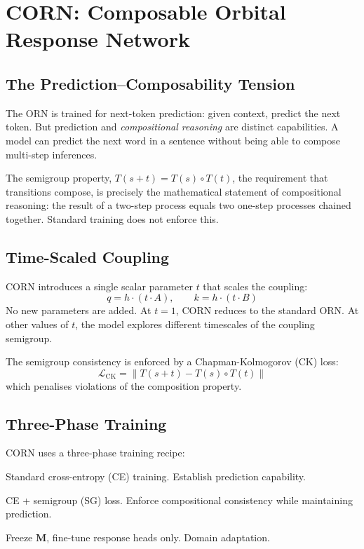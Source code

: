 \documentclass[11pt, a4paper]{article}
\newcommand{\M}{\mathbf{M}}
\theoremstyle{plain}
\theoremstyle{remark}
\begin{document}
\section{CORN: Composable Orbital Response Network}

\subsection{The Prediction--Composability Tension}

The ORN is trained for next-token prediction: given context, predict the next token.
But prediction and \emph{compositional reasoning} are distinct capabilities.
A model can predict the next word in a sentence without being able to compose multi-step inferences.

The semigroup property, $T(s+t) = T(s) \circ T(t)$, the requirement that transitions compose, is precisely the mathematical statement of compositional reasoning: the result of a two-step process equals two one-step processes chained together.
Standard training does not enforce this.

\subsection{Time-Scaled Coupling}

CORN introduces a single scalar parameter $t$ that scales the coupling:
\begin{equation}
    q = h \cdot (t \cdot A), \qquad k = h \cdot (t \cdot B)
\end{equation}
No new parameters are added.
At $t = 1$, CORN reduces to the standard ORN.
At other values of $t$, the model explores different timescales of the coupling semigroup.

The semigroup consistency is enforced by a Chapman-Kolmogorov (CK) loss:
\begin{equation}
    \mathcal{L}_{\text{CK}} = \left\| T(s+t) - T(s) \circ T(t) \right\|
\end{equation}
which penalises violations of the composition property.

\subsection{Three-Phase Training}

CORN uses a three-phase training recipe:
\begin{description}[nosep, leftmargin=1.5em]
    \item[Phase 1:] Standard cross-entropy (CE) training. Establish prediction capability.
    \item[Phase 2:] CE + semigroup (SG) loss. Enforce compositional consistency while maintaining prediction.
    \item[Phase 3:] Freeze $\M$, fine-tune response heads only. Domain adaptation.
\end{description}
\end{document}
